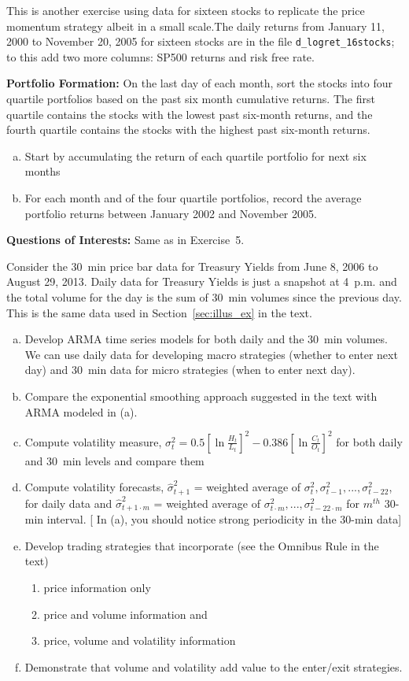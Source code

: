 \prob This is another exercise using data for sixteen stocks to replicate the price momentum strategy albeit in a small scale.The daily returns from January 11, 2000 to November 20, 2005 for sixteen stocks are in the file \texttt{d\_logret\_16stocks};
to this add two more columns: SP500 returns and risk free rate. \medskip

\noindent \textbf{Portfolio Formation:} \hfill \break
    On the last day of each month, sort the stocks into four quartile portfolios based on the past six month
cumulative returns. The first quartile contains the stocks with the lowest past six-month returns, and the
fourth quartile contains the stocks with the highest past six-month returns.
        \begin{enumerate}[(a)]
        \item Start by accumulating the return of each quartile portfolio for next six months
        \item For each month and of the four quartile portfolios, record the average portfolio returns between January 2002 and November 2005.
        \end{enumerate}
    \textbf{Questions of Interests:} Same as in Exercise~5. \twomedskip


\prob Consider the 30~min price bar data for Treasury Yields from June 8, 2006 to August 29, 2013. Daily data for Treasury Yields is just a snapshot at 4~p.m. and the total volume for the day is the sum of 30~min volumes since the previous day. This is the same data used in Section~\ref{sec:illus_ex} in the text.
   \begin{enumerate}[(a)]
   \item Develop ARMA time series models for both daily and the 30~min volumes. We can use daily data
for developing macro strategies (whether to enter next day) and 30~min data for micro strategies (when to enter next day).
\item Compare the exponential smoothing approach suggested in the text with ARMA modeled in (a).
   \item Compute volatility measure, $\sigma_t^2 = 0.5[\ln{\frac{H_t}{L_t}}]^2 - 0.386[\ln{\frac{C_t}{O_t}}]^2$ for both daily and 30~min levels and compare them
   \item Compute volatility forecasts, $\hat{\sigma}_{t+1}^2$ = weighted average of $\sigma_{t}^2, \sigma_{t-1}^2,...,\sigma_{t-22}^2$, for daily data and $\hat{\sigma}_{t+1\cdot m}^2$ = weighted average of $\sigma_{t\cdot m}^2,...,\sigma_{t-22\cdot m}^2$ for $m^{th}$ 30-min interval. [ In (a), you should notice strong periodicity in the 30-min data]
   \item Develop trading strategies that incorporate (see the Omnibus Rule in the text)
      \begin{enumerate}
      \item price information only
      \item price and volume information and
      \item price, volume and volatility information
      \end{enumerate}
         \item Demonstrate that volume and volatility add value to the enter/exit strategies. \twomedskip
   \end{enumerate}